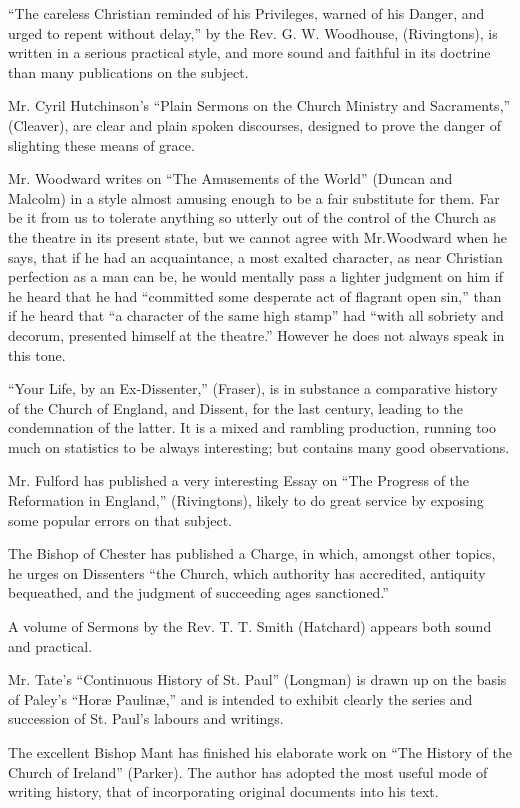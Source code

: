 ``The careless Christian reminded of his Privileges,
warned of his Danger, and urged to repent without delay,'' by the Rev. G.
W. Woodhouse, (Rivingtons), is written in a serious practical style, and
more sound and faithful in its doctrine than many publications on the
subject.

Mr. Cyril Hutchinson's ``Plain Sermons on the Church
Ministry and Sacraments,'' (Cleaver), are clear and plain spoken
discourses, designed to prove the danger of slighting these means of
grace.

Mr. Woodward writes on ``The Amusements of the World''
(Duncan and Malcolm) in a style almost amusing enough to be a fair
substitute for them. Far be it from us to tolerate anything so utterly
out of the control of the Church as the theatre in its present state,
but we cannot agree with Mr.Woodward when he says, that if he had an
acquaintance, a most exalted character, as near Christian perfection as
a man can be, he would mentally pass a lighter judgment on him if he
heard that he had ``committed some desperate act of flagrant open sin,''
than if he heard that ``a character of the same high stamp'' had ``with all
sobriety and decorum, presented himself at the theatre.'' However he does
not always speak in this tone.

``Your Life, by an Ex-Dissenter,'' (Fraser), is in
substance a comparative history of the Church of England, and Dissent,
for the last century, leading to the condemnation of the latter. It is a
mixed and rambling production, running too much on statistics to be
always interesting; but contains many good observations.

Mr. Fulford has published a very interesting Essay
on ``The Progress of the Reformation in England,'' (Rivingtons),
likely to do great service by exposing some popular errors on that
subject.

The Bishop of Chester has published a Charge, in
which, amongst other topics, he urges on Dissenters ``the Church, which
authority has accredited, antiquity bequeathed, and the judgment of
succeeding ages sanctioned.''

A volume of Sermons by the Rev. T. T. Smith (Hatchard)
appears both sound and practical.

Mr. Tate's ``Continuous History of St. Paul'' (Longman)
is drawn up on the basis of Paley's ``Horæ Paulinæ,'' and is intended to
exhibit clearly the series and succession of St. Paul's labours and
writings.

The excellent Bishop Mant has finished his
elaborate work on ``The History of the Church of Ireland'' (Parker). The
author has adopted the most useful mode of writing history, that of
incorporating original documents into his text.

